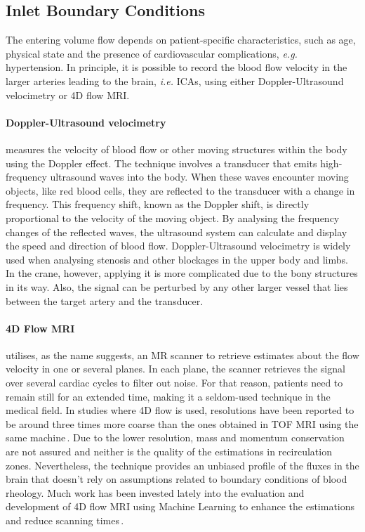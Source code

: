 \subsection{Inlet Boundary Conditions}\label{chap3:sec2:subsec:2}
The entering volume flow depends on patient-specific characteristics, such as age, physical state and the presence of cardiovascular complications, \textit{e.g.} \,hypertension. In principle, it is possible to record the blood flow velocity in the larger arteries leading to the brain, \textit{i.e.} ICAs, using either Doppler-Ultrasound velocimetry or 4D flow MRI\@.

\paragraph{Doppler-Ultrasound velocimetry} measures the velocity of blood flow or other moving structures within the body using the Doppler effect. The technique involves a transducer that emits high-frequency ultrasound waves into the body. When these waves encounter moving objects, like red blood cells, they are reflected to the transducer with a change in frequency. This frequency shift, known as the Doppler shift, is directly proportional to the velocity of the moving object. By analysing the frequency changes of the reflected waves, the ultrasound system can calculate and display the speed and direction of blood flow. Doppler-Ultrasound velocimetry is widely used when analysing stenosis and other blockages in the upper body and limbs. In the crane, however, applying it is more complicated due to the bony structures in its way. Also, the signal can be perturbed by any other larger vessel that lies between the target artery and the transducer.

\paragraph{4D Flow MRI} utilises, as the name suggests, an MR scanner to retrieve estimates about the flow velocity in one or several planes. In each plane, the scanner retrieves the signal over several cardiac cycles to filter out noise. For that reason, patients need to remain still for an extended time, making it a seldom-used technique in the medical field. In studies where 4D flow is used, resolutions have been reported to be around three times more coarse than the ones obtained in TOF MRI using the same machine\,\cite{Berg2014}. Due to the lower resolution, mass and momentum conservation are not assured and neither is the quality of the estimations in recirculation zones. Nevertheless, the technique provides an unbiased profile of the fluxes in the brain that doesn't rely on assumptions related to boundary conditions of blood rheology. Much work has been invested lately into the evaluation and development of 4D flow MRI using Machine Learning to enhance the estimations and reduce scanning times\,\cite{Harloff2013, Rutkowski2021, Cherry2022}.

